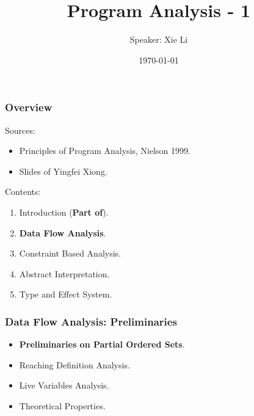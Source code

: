 \documentclass[aspectratio=1610, 13pt]{beamer}
\title{Program Analysis - 1}
\date{\today}
\author{Speaker: Xie Li}
\begin{document}
\maketitle

\begin{frame}\frametitle{Overview}
Sources:
\begin{itemize}
\item Principles of Program Analysis, Nielson 1999.
\item Slides of Yingfei Xiong.
\end{itemize}
Contents:
\begin{enumerate}

\item Introduction (\textbf{Part of}).
\item \textbf{Data Flow Analysis}.
\item Constraint Based Analysis.
\item Abstract Interpretation.
\item Type and Effect System.
\end{enumerate}

\end{frame}


\begin{frame}\frametitle{Data Flow Analysis: Preliminaries}
\begin{itemize}
\item \textbf{Preliminaries on Partial Ordered Sets}.
\item Reaching Definition Analysis.
\item Live Variables Analysis.
\item Theoretical Properties.


\end{itemize}
\end{frame}
\end{document}
